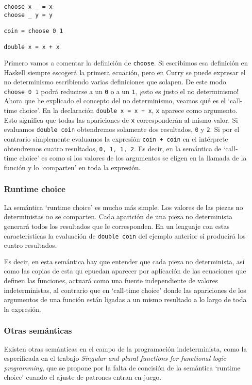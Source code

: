 \documentclass[class=article, crop=false]{standalone}
\begin{document}
\begin{verbatim}
choose x _ = x
choose _ y = y

coin = choose 0 1

double x = x + x
\end{verbatim}

Primero vamos a comentar la definición de \verb`choose`. Si escribimos esa definición en
Haskell siempre escogerá la primera ecuación, pero en Curry se puede expresar el no
determinismo escribiendo varias definiciones que solapen. De este modo \verb`choose 0 1`
podrá reducirse a un \verb`0` o a un \verb`1`, ¡esto es justo el no determinismo! Ahora que
he explicado el concepto del no determinismo, veamos qué es el `call-time choice'. En la
declaración \verb`double x = x + x`, \verb`x` aparece como argumento. Esto significa que
todas las apariciones de \verb`x` corresponderán al mismo valor. Si evaluamos
\verb`double coin` obtendremos solamente dos resultados, \verb`0` y \verb`2`. Si por el
contrario simplemente evaluamos la expresión \verb`coin + coin` en el intérprete obtendremos
cuatro resultados, \verb`0, 1, 1, 2`. Es decir, en la semántica de `call-time choice' es como
si los valores de los argumentos se eligen en la llamada de la función y lo `comparten' en
toda la expresión.

\subsubsection{Runtime choice}
La semántica `runtime choice' es mucho más simple. Los valores de las piezas no
deterministas no se comparten. Cada aparición de una pieza no determinista generará todos los
resultados que le corresponden. En un lenguaje con estas características la evaluación de
\verb`double coin` del ejemplo anterior sí producirá los cuatro resultados.

Es decir, en esta semántica hay que entender que cada pieza no determinista, así como las
copias de esta qu epuedan aparecer por aplicación de las ecuaciones que definen las
funciones, actuará como una fuente independiente de valores indeterministas, al contrario que
en `call-time choice' donde las apariciones de los argumentos de una función están ligadas a
un mismo resultado a lo largo de toda la expresión.

\subsubsection{Otras semánticas}
Existen otras semánticas en el campo de la programación indeterminista, como la especificada
en el trabajo \textit{Singular and plural functions for functional logic programming}\cite{
riesco2014singular}, que se propone por la falta de concisión de la semántica `runtime
choice' cuando el ajuste de patrones entran en juego.
\end{document}
